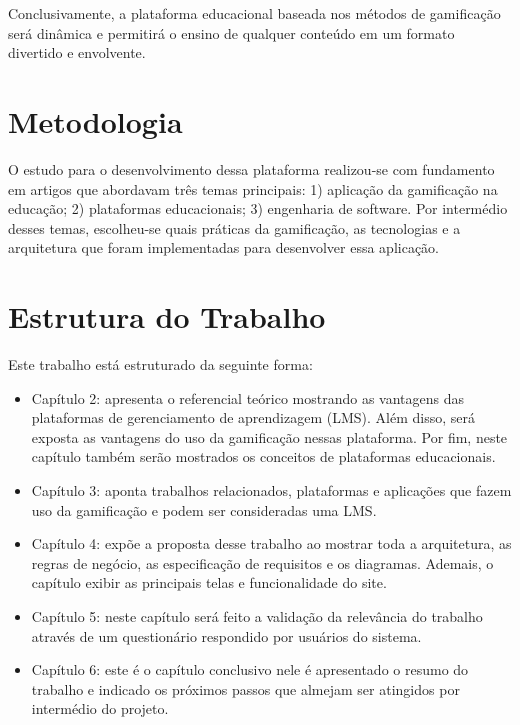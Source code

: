 Conclusivamente, a plataforma educacional baseada nos métodos de gamificação será dinâmica e permitirá o ensino de qualquer conteúdo em um formato divertido e envolvente. 

\section{Metodologia}
\label{sc:metodologia}

O estudo para o desenvolvimento dessa plataforma realizou-se com fundamento em artigos que abordavam três temas principais: 1) aplicação da gamificação na educação; 2) plataformas educacionais; 3) engenharia de software. Por intermédio desses temas, escolheu-se quais práticas da gamificação, as tecnologias e a arquitetura que foram implementadas para desenvolver essa aplicação.

\section{Estrutura do Trabalho}
\label{sc:estruturaDoTrabalho}

Este trabalho está estruturado da seguinte forma:    

\begin{itemize}
\item Capítulo 2: apresenta o referencial teórico mostrando as vantagens das plataformas de gerenciamento de aprendizagem (LMS). Além disso, será exposta as vantagens do uso da gamificação nessas plataforma. Por fim, neste capítulo também serão mostrados os conceitos de plataformas educacionais.
\item Capítulo 3: aponta trabalhos relacionados, plataformas e aplicações que fazem uso da gamificação e podem ser consideradas uma LMS.
\item Capítulo 4: expõe a proposta desse trabalho ao mostrar toda a arquitetura, as regras de negócio, as especificação de requisitos e os diagramas. Ademais, o capítulo exibir as principais telas e funcionalidade do site.
\item Capítulo 5: neste capítulo será feito a validação da relevância do trabalho através de um questionário respondido por usuários do sistema.
\item Capítulo 6: este é o capítulo conclusivo nele é apresentado o resumo do trabalho e indicado os próximos passos que almejam ser atingidos por intermédio do projeto.

\end{itemize}


